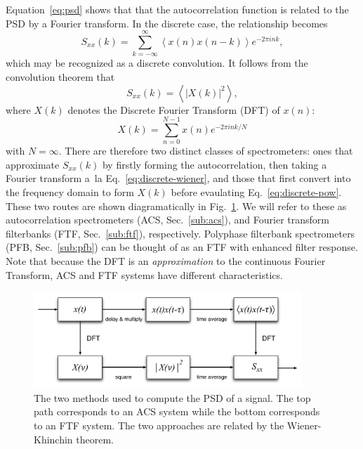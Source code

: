 \documentclass{ws-rv961x669}
\begin{document}
Equation~\ref{eq:psd} shows that that the autocorrelation function is related to the PSD by a Fourier transform. In the discrete case, the relationship becomes
\begin{equation}
S_{xx}(k)=\sum_{k=-\infty}^{\infty}\left\langle x(n)x(n-k)\right\rangle e^{-2\pi ink},\label{eq:discrete-wiener}
\end{equation}
which may be recognized as a discrete convolution. It follows from the convolution theorem that 
\begin{equation}
S_{xx}(k)=\left\langle \left|X(k)\right|^{2}\right\rangle ,\label{eq:discrete-pow}
\end{equation}
where $X(k)$ denotes the Discrete Fourier Transform (DFT) of $x(n)$:
\begin{equation}
X(k)=\sum_{n=0}^{N-1}x(n)e^{-2\pi ink/N}\label{eq:dft1}
\end{equation}
with $N=\infty$. There are therefore two distinct classes of spectrometers: ones that approximate $S_{xx}(k)$ by firstly forming the autocorrelation, then taking a Fourier transform a~la Eq.~\ref{eq:discrete-wiener}, and those that first convert into the frequency domain to form $X(k)$ before evaulating Eq.~\ref{eq:discrete-pow}. These two routes are shown diagramatically in Fig.~\ref{fig:wiener}. We will refer to these as autocorrelation spectrometers (ACS, Sec.~\ref{sub:acs}), and Fourier transform filterbanks (FTF, Sec.~\ref{sub:ftf}), respectively. Polyphase filterbank spectrometers (PFB, Sec.~\ref{sub:pfb}) can be thought of as an  FTF with enhanced filter response. Note that because the DFT is an \emph{approximation} to the continuous Fourier Transform, ACS and FTF systems have different characteristics. 

\begin{figure}[t]
 \centering
 \includegraphics[width=0.9\textwidth]{./figures/wiener}
 \caption{The two methods used to compute the PSD of a signal. The top path corresponds to an ACS system while the bottom corresponds to an FTF system. The two approaches are related by the Wiener-Khinchin theorem. \label{fig:wiener}  }
\end{figure}
\end{document}
